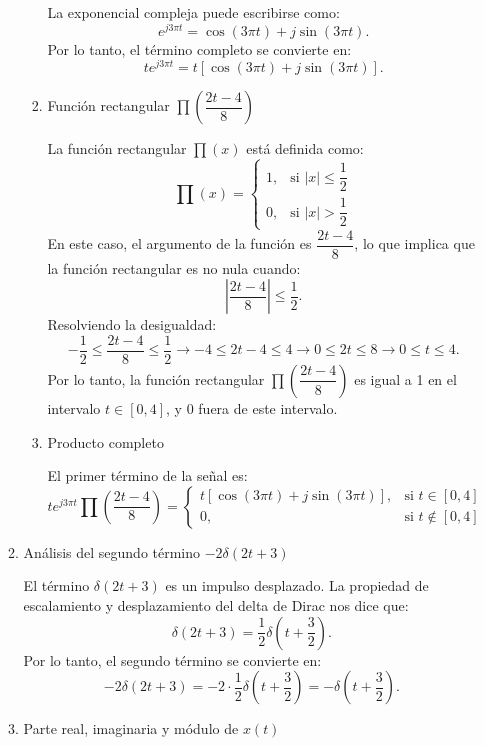 \begin{enumerate}[label=\color{red}\textbf{\arabic*)}]
\begin{enumerate}[label=Paso \arabic*:]
\begin{enumerate}[label=\alph*)]
                La exponencial compleja puede escribirse como: \[
                e^{j 3\pi t}=\cos(3\pi t)+j\sin(3\pi t). 
                \] 
                Por lo tanto, el término completo se convierte en: \[
                    te^{j 3\pi t}=t[\cos(3\pi t)+j\sin(3\pi t)] .
                \] 
            \item Función rectangular $\prod\left( \dfrac{2t-4}{8} \right) $

                La función rectangular $\prod(x)$ está definida como:  \[
                \prod(x)=\begin{cases}
                    1, & \text{si }|x|\le \dfrac{1}{2}\\
                    0, & \text{si }|x| > \dfrac{1}{2}
                \end{cases}
                \] 
                En este caso, el argumento de la función es $\dfrac{2t-4}{8}$, lo que implica que la función rectangular es no nula cuando: \[
                \left| \dfrac{2t-4}{8} \right| \le \dfrac{1}{2}.
                \] 
                Resolviendo la desigualdad: \[
                -\dfrac{1}{2}\le \dfrac{2t-4}{8}\le \dfrac{1}{2}\longrightarrow -4\le 2t-4\le 4\longrightarrow 0\le 2t\le 8\longrightarrow 0\le t\le 4.
                \] 
                Por lo tanto, la función rectangular $\prod\left( \dfrac{2t-4}{8} \right) $ es igual a 1 en el intervalo $t\in [0,4]$, y 0 fuera de este intervalo.
            \item Producto completo

                El primer término de la señal es: \[
               te^{j 3\pi t}\prod\left( \dfrac{2t-4}{8} \right) =\begin{cases}
                   t[\cos(3\pi t)+j\sin(3\pi t)], & \text{si }t\in [0,4]\\
                   0, & \text{si }t\notin [0,4]
               \end{cases}  
                \] 
        \end{enumerate}
    \item Análisis del segundo término $-2\delta(2t+3)$

        El término  $\delta(2t+3)$ es un impulso desplazado. La propiedad de escalamiento y desplazamiento del delta de Dirac nos dice que:  \[
        \delta(2t+3)=\dfrac{1}{2}\delta\left( t+\dfrac{3}{2} \right) .
        \] 
        Por lo tanto, el segundo término se convierte en: \[
        -2\delta(2t+3)=-2\cdot \dfrac{1}{2}\delta\left( t+\dfrac{3}{2} \right) =-\delta\left( t+\dfrac{3}{2} \right) .
        \] 
    \item Parte real, imaginaria y módulo de $x(t)$


\end{enumerate}
\end{enumerate}
